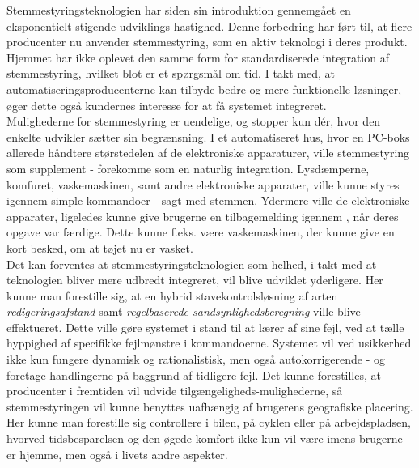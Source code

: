 Stemmestyringsteknologien har siden sin introduktion gennemgået en eksponentielt stigende udviklings hastighed. Denne forbedring har ført til, at flere producenter nu anvender stemmestyring, som en aktiv teknologi i deres produkt. Hjemmet har ikke oplevet den samme form for standardiserede integration af stemmestyring, hvilket blot er et spørgsmål om tid. I takt med, at automatiseringsproducenterne kan tilbyde bedre og mere funktionelle løsninger, øger dette også kundernes interesse for at få systemet integreret. \\
Mulighederne for stemmestyring er uendelige, og stopper kun dér, hvor den enkelte udvikler sætter sin begrænsning. I et automatiseret hus, hvor en PC-boks allerede håndtere størstedelen af de elektroniske apparaturer, ville stemmestyring som supplement - forekomme som en naturlig integration. Lysdæmperne, komfuret, vaskemaskinen, samt andre elektroniske apparater, ville kunne styres igennem simple kommandoer - sagt med stemmen. Ydermere ville de elektroniske apparater, ligeledes kunne give brugerne en tilbagemelding igennem , når deres opgave var færdige. Dette kunne f.eks. være vaskemaskinen, der kunne give en kort besked, om at tøjet nu er vasket. \\
Det kan forventes at stemmestyringsteknologien som helhed, i takt med at teknologien bliver mere udbredt integreret, vil blive udviklet yderligere. Her kunne man forestille sig, at en hybrid stavekontrolsløsning af arten \textit {redigeringsafstand} samt \textit{regelbaserede sandsynlighedsberegning} ville blive effektueret. Dette ville gøre systemet i stand til at lærer af sine fejl, ved at tælle hyppighed af specifikke fejlmønstre i kommandoerne. Systemet vil ved usikkerhed ikke kun fungere dynamisk og rationalistisk, men også autokorrigerende - og foretage handlingerne på baggrund af tidligere fejl.
Det kunne forestilles, at producenter i fremtiden vil udvide tilgængeligheds-mulighederne, så stemmestyringen vil kunne benyttes uafhængig af brugerens geografiske placering. Her kunne man forestille sig controllere i bilen, på cyklen eller på arbejdspladsen, hvorved tidsbesparelsen og den øgede komfort ikke kun vil være imens brugerne er hjemme, men også i livets andre aspekter.\\

